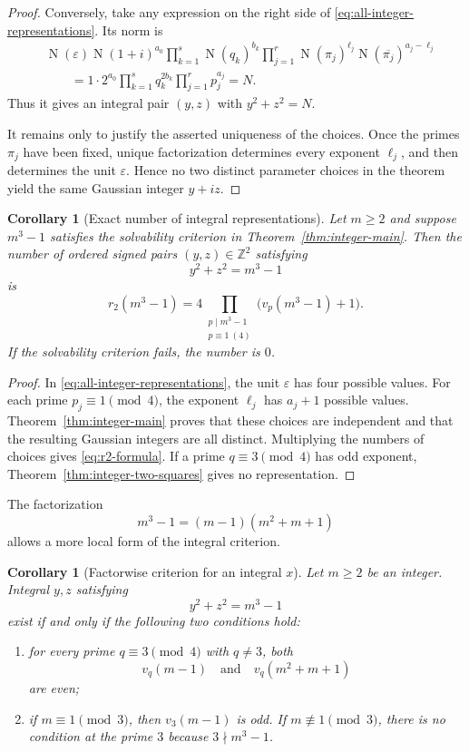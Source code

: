 \documentclass[11pt,a4paper]{article}
\numberwithin{equation}{section}
\newtheorem{corollary}[theorem]{Corollary}
\theoremstyle{definition}
\theoremstyle{remark}
\newcommand{\Z}{\mathbb Z}
\newcommand{\Norm}{\operatorname{N}}
\newcommand{\ndivides}{\mathrel{\nmid}}
\begin{document}
\begin{proof}
Conversely, take any expression on the right side of \eqref{eq:all-integer-representations}. Its norm is
\begin{align*}
 &\Norm(\varepsilon)
 \Norm(1+i)^{a_0}
 \prod_{k=1}^{s}\Norm(q_k)^{b_k}
 \prod_{j=1}^{r}
   \Norm(\pi_j)^{\ell_j}
   \Norm(\overline{\pi_j})^{a_j-\ell_j}\\
 &\qquad=
 1\cdot2^{a_0}
 \prod_{k=1}^{s}q_k^{2b_k}
 \prod_{j=1}^{r}p_j^{a_j}
 =N.
\end{align*}
Thus it gives an integral pair $(y,z)$ with $y^2+z^2=N$.

It remains only to justify the asserted uniqueness of the choices. Once the primes $\pi_j$ have been fixed, unique factorization determines every exponent $\ell_j$, and then determines the unit $\varepsilon$. Hence no two distinct parameter choices in the theorem yield the same Gaussian integer $y+iz$.
\end{proof}

\begin{corollary}[Exact number of integral representations]
\label{cor:r2-count}
Let $m\geq2$ and suppose $m^3-1$ satisfies the solvability criterion in Theorem~\ref{thm:integer-main}. Then the number of ordered signed pairs $(y,z)\in\Z^2$ satisfying
\[
 y^2+z^2=m^3-1
\]
is
\begin{equation}
 \boxed{
 r_2(m^3-1)
 =4\prod_{\substack{p\mid m^3-1\\p\equiv1\ (4)}}
 \bigl(v_p(m^3-1)+1\bigr).}
 \label{eq:r2-formula}
\end{equation}
If the solvability criterion fails, the number is $0$.
\end{corollary}

\begin{proof}
In \eqref{eq:all-integer-representations}, the unit $\varepsilon$ has four possible values. For each prime $p_j\equiv1\pmod4$, the exponent $\ell_j$ has $a_j+1$ possible values. Theorem~\ref{thm:integer-main} proves that these choices are independent and that the resulting Gaussian integers are all distinct. Multiplying the numbers of choices gives \eqref{eq:r2-formula}. If a prime $q\equiv3\pmod4$ has odd exponent, Theorem~\ref{thm:integer-two-squares} gives no representation.
\end{proof}

The factorization
\[
 m^3-1=(m-1)(m^2+m+1)
\]
allows a more local form of the integral criterion.

\begin{corollary}[Factorwise criterion for an integral $x$]
\label{cor:factorwise}
Let $m\geq2$ be an integer. Integral $y,z$ satisfying
\[
 y^2+z^2=m^3-1
\]
exist if and only if the following two conditions hold:
\begin{enumerate}[label=\textup{(\roman*)}]
 \item for every prime $q\equiv3\pmod4$ with $q\neq3$, both
 \[
  v_q(m-1)
  \quad\text{and}\quad
  v_q(m^2+m+1)
 \]
 are even;
 \item if $m\equiv1\pmod3$, then $v_3(m-1)$ is odd. If $m\not\equiv1\pmod3$, there is no condition at the prime $3$ because $3\ndivides m^3-1$.
\end{enumerate}
\end{corollary}
\end{document}

